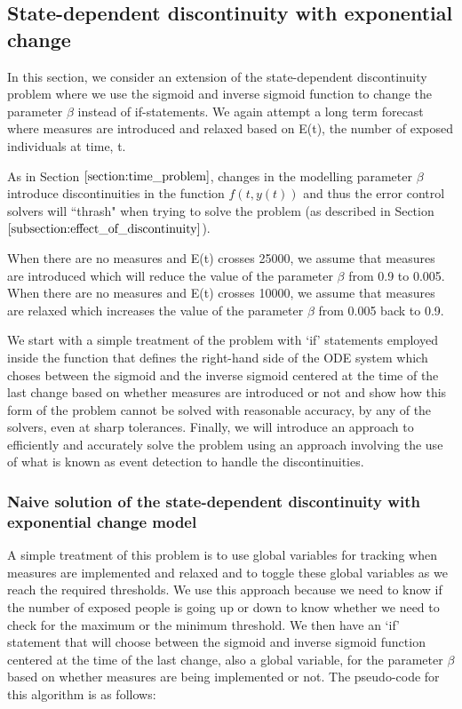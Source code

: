 \subsection{State-dependent discontinuity with exponential change}
In this section, we consider an extension of the state-dependent discontinuity problem where we use the sigmoid and inverse sigmoid function to change the parameter $\beta$ instead of if-statements. We again attempt a long term forecast where measures are introduced and relaxed based on E(t), the number of exposed individuals at time, t.



As in Section $\ref{section:time_problem}$, changes in the modelling parameter $\beta$ introduce discontinuities in the function $f(t, y(t))$ and thus the error control solvers will ``thrash" when trying to solve the problem (as described in Section $\ref{subsection:effect_of_discontinuity}$). 

When there are no measures and E(t) crosses 25000, we assume that measures are introduced which will reduce the value of the parameter $\beta$ from 0.9 to 0.005. When there are no measures and E(t) crosses 10000, we assume that measures are relaxed which increases the value of the parameter $\beta$ from 0.005 back to 0.9.

We start with a simple treatment of the problem with `if' statements employed inside the function that defines the right-hand side of the ODE system which choses between the sigmoid and the inverse sigmoid centered at the time of the last change based on whether measures are introduced or not and show how this form of the problem cannot be solved with reasonable accuracy, by any of the solvers, even at sharp tolerances. Finally, we will introduce an approach to efficiently and accurately solve the problem using an approach involving the use of what is known as event detection to handle the discontinuities.
\subsubsection{Naive solution of the state-dependent discontinuity with exponential change model}
A simple treatment of this problem is to use global variables for tracking when measures are implemented and relaxed and to toggle these global variables as we reach the required thresholds. We use this approach because we need to know if the number of exposed people is going up or down to know whether we need to check for the maximum or the minimum threshold. We then have an `if' statement that will choose between the sigmoid and inverse sigmoid function centered at the time of the last change, also a global variable, for the parameter $\beta$ based on whether measures are being implemented or not. The pseudo-code for this algorithm is as follows:

